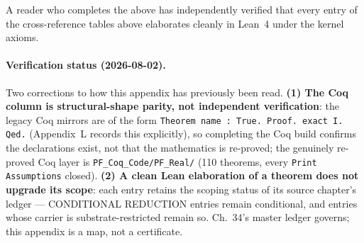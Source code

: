 A reader who completes the above has independently verified that
every entry of the cross-reference tables above elaborates cleanly
in Lean~4 under the kernel axioms.

\paragraph{Verification status (2026-08-02).} Two corrections to how
this appendix has previously been read. \textbf{(1) The Coq column is
structural-shape parity, not independent verification}: the legacy
Coq mirrors are of the form \texttt{Theorem name : True. Proof. exact
I. Qed.} (Appendix~L records this explicitly), so completing the Coq
build confirms the declarations exist, not that the mathematics is
re-proved; the genuinely re-proved Coq layer is
\texttt{PF\_Coq\_Code/PF\_Real/} (110 theorems, every
\texttt{Print Assumptions} closed). \textbf{(2) A clean Lean
elaboration of a theorem does not upgrade its scope}: each entry
retains the scoping status of its source chapter's ledger ---
CONDITIONAL REDUCTION entries remain conditional, and entries whose
carrier is substrate-restricted remain so. Ch.~34's master ledger
governs; this appendix is a map, not a certificate.
